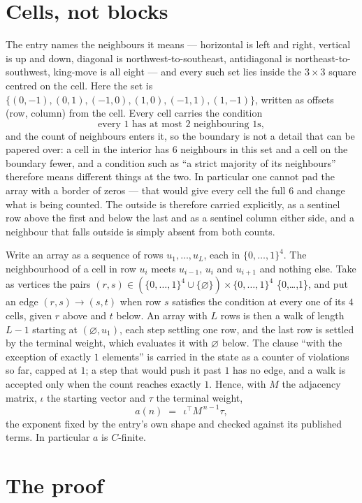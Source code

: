 \documentclass[11pt,a4paper]{article}
\theoremstyle{plain}
\theoremstyle{definition}
\begin{document}
\section{Cells, not blocks}

The entry names the neighbours it means --- horizontal is left and right, vertical is up and
down, diagonal is northwest-to-southeast, antidiagonal is northeast-to-southwest, king-move is
all eight --- and every such set lies inside the $3\times3$ square centred on the cell. Here
the set is $\{(0,-1), (0,1), (-1,0), (1,0), (-1,1), (1,-1)\}$, written as offsets (row, column) from the cell. Every cell carries
the condition
\[
\text{every 1 has at most 2 neighbouring 1s},
\]
and the count of neighbours enters it, so the boundary is not a detail that can be papered
over: a cell in the interior has $6$ neighbours in this set and a cell on the boundary
fewer, and a condition such as ``a strict majority of its neighbours'' therefore means
different things at the two. In particular one cannot pad the array with a border of zeros ---
that would give every cell the full $6$ and change what is being counted. The outside is
therefore carried
explicitly, as a sentinel row above the first and below the last and as a sentinel column
either side, and a neighbour that falls outside is simply absent from both counts.

Write an array as a sequence of rows $u_1,\dots,u_L$, each in
$\{0,\dots,1\}^{4}$. The neighbourhood of a cell in row $u_i$ meets $u_{i-1}$,
$u_i$ and $u_{i+1}$ and nothing else. Take as vertices the pairs
$(r,s)\in(\{0,\dots,1\}^{4}\cup\{\varnothing\})\times\{0,\dots,1\}^{4}$ \times \{0,\dots,1\},
and put an edge $(r,s)\to(s,t)$ when row $s$ satisfies the condition at every one of its
$4$ cells, given $r$ above and $t$ below. An array with $L$ rows is then a walk of length
$L-1$ starting at $(\varnothing,u_1)$, each step settling one row, and the last row is
settled by the terminal weight, which evaluates it with $\varnothing$ below. The clause ``with the exception of exactly $1$ elements'' is carried in
the state as a counter of violations so far, capped at $1$; a step that would push it past
$1$ has no edge, and a walk is accepted only when the count reaches exactly $1$. Hence,
with $M$ the adjacency matrix, $\iota$ the starting vector and $\tau$ the terminal weight,
\[
a(n)\;=\;\,\iota^{\!\top}M^{\,n-1}\tau ,
\]
the exponent fixed by the entry's own shape and checked against its published terms. In
particular $a$ is $C$-finite.

\section{The proof}
\end{document}

